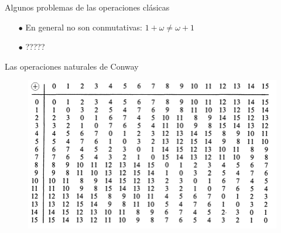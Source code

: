 \documentclass[10pt,spanish]{beamer}
\begin{document}
\begin{frame}{Algunos problemas de las operaciones clásicas}


\begin{itemize}
	\item[$\bullet$]En general no son conmutativas: $1 + \omega \neq \omega + 1$
	\item[$\bullet$]????? %
\end{itemize}

\end{frame}

\begin{frame}{Las operaciones naturales de Conway}








\end{frame}

\begin{frame}
\begin{figure}
	\includegraphics[scale=0.5,left]{nim_addition.png}
\end{figure}
\end{frame}
\end{document}
